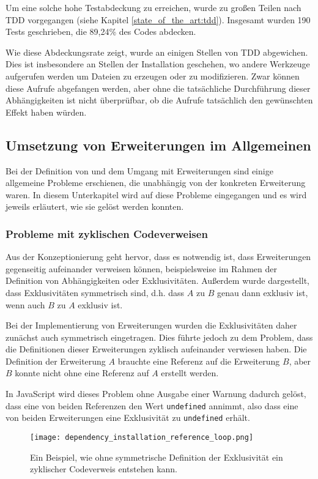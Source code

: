 Um eine solche hohe Testabdeckung zu erreichen, wurde zu großen Teilen nach \gls{TDD} vorgegangen (siehe Kapitel \ref{state_of_the_art:tdd}). Insgesamt wurden 190 Tests geschrieben, die 89,24\% des Codes abdecken.

Wie diese Abdeckungsrate zeigt, wurde an einigen Stellen von \gls{TDD} abgewichen. Dies ist insbesondere an Stellen der Installation geschehen, wo andere Werkzeuge aufgerufen werden um Dateien zu erzeugen oder zu modifizieren. Zwar können diese Aufrufe abgefangen werden, aber ohne die tatsächliche Durchführung dieser Abhängigkeiten ist nicht überprüfbar, ob die Aufrufe tatsächlich den gewünschten Effekt haben würden.

\subsection{Umsetzung von Erweiterungen im Allgemeinen}
Bei der Definition von und dem Umgang mit Erweiterungen sind einige allgemeine Probleme erschienen, die unabhängig von der konkreten Erweiterung waren. In diesem Unterkapitel wird auf diese Probleme eingegangen und es wird jeweils erläutert, wie sie gelöst werden konnten.

\subsubsection{Probleme mit zyklischen Codeverweisen}
Aus der Konzeptionierung geht hervor, dass es notwendig ist, dass Erweiterungen gegenseitig aufeinander verweisen können, beispielsweise im Rahmen der Definition von Abhängigkeiten oder Exklusivitäten. Außerdem wurde dargestellt, dass Exklusivitäten symmetrisch sind, d.h. dass $A$ zu $B$ genau dann exklusiv ist, wenn auch $B$ zu $A$ exklusiv ist.

Bei der Implementierung von Erweiterungen wurden die Exklusivitäten daher zunächst auch symmetrisch eingetragen. Dies führte jedoch zu dem Problem, dass die Definitionen dieser Erweiterungen zyklisch aufeinander verwiesen haben. Die Definition der Erweiterung $A$ brauchte eine Referenz auf die Erweiterung $B$, aber $B$ konnte nicht ohne eine Referenz auf $A$ erstellt werden.

In JavaScript wird dieses Problem ohne Ausgabe einer Warnung dadurch gelöst, dass eine von beiden Referenzen den Wert \verb|undefined| annimmt, also dass eine von beiden Erweiterungen eine Exklusivität zu \verb|undefined| erhält.

  \begin{figure}
	\centering
		\texttt{[image: dependency\_installation\_reference\_loop.png]}
      	\caption{Ein Beispiel, wie ohne symmetrische Definition der Exklusivität ein zyklischer Codeverweis entstehen kann.}
		\label{fig:impl:dependency_installation_import_issue_example}
  \end{figure}

